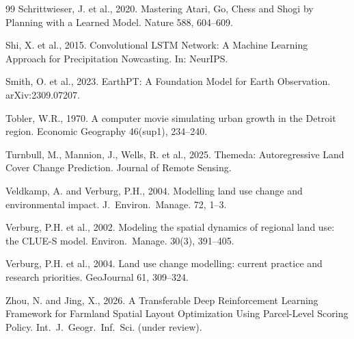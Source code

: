 \documentclass{article}
\begin{document}
\begin{thebibliography}{99}
Schrittwieser, J. et al., 2020. Mastering Atari, Go, Chess and Shogi by Planning with a Learned Model. Nature 588, 604--609.

Shi, X. et al., 2015. Convolutional LSTM Network: A Machine Learning Approach for Precipitation Nowcasting. In: NeurIPS.

Smith, O. et al., 2023. EarthPT: A Foundation Model for Earth Observation. arXiv:2309.07207.

Tobler, W.R., 1970. A computer movie simulating urban growth in the Detroit region. Economic Geography 46(sup1), 234--240.

Turnbull, M., Mannion, J., Wells, R. et al., 2025. Themeda: Autoregressive Land Cover Change Prediction. Journal of Remote Sensing.

Veldkamp, A. and Verburg, P.H., 2004. Modelling land use change and environmental impact. J.~Environ.~Manage. 72, 1--3.

Verburg, P.H. et al., 2002. Modeling the spatial dynamics of regional land use: the CLUE-S model. Environ.~Manage. 30(3), 391--405.

Verburg, P.H. et al., 2004. Land use change modelling: current practice and research priorities. GeoJournal 61, 309--324.

Zhou, N. and Jing, X., 2026. A Transferable Deep Reinforcement Learning Framework for Farmland Spatial Layout Optimization Using Parcel-Level Scoring Policy. Int.~J.~Geogr.~Inf.~Sci. (under review).

\end{thebibliography}
\end{document}
